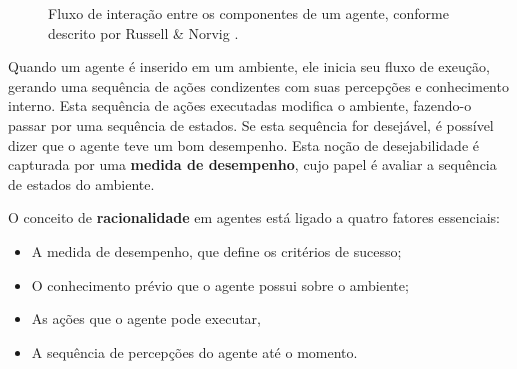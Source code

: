 \begin{figure}[h]
\centering
{}
\caption{Fluxo de interação entre os componentes de um agente, conforme descrito
	por Russell \& Norvig \cite{RussellNorvig200912}.}
\label{fig:agent-interaction}
\end{figure}

Quando um agente é inserido em um ambiente, ele inicia seu fluxo de exeução,
gerando uma sequência de ações condizentes com suas percepções e conhecimento
interno. Esta sequência de ações executadas modifica o ambiente, fazendo-o
passar por uma sequência de estados. Se esta sequência for desejável, é possível
dizer que o agente teve um bom desempenho. Esta noção de desejabilidade é
capturada por uma \textbf{medida de desempenho}, cujo papel é avaliar a
sequência de estados do ambiente.

O conceito de \textbf{racionalidade} em agentes está ligado a quatro fatores
essenciais:

\begin{itemize}
	\item A medida de desempenho, que define os critérios de sucesso;
	\item O conhecimento prévio que o agente possui sobre o ambiente;
	\item As ações que o agente pode executar,
	\item A sequência de percepções do agente até o momento.
\end{itemize}

